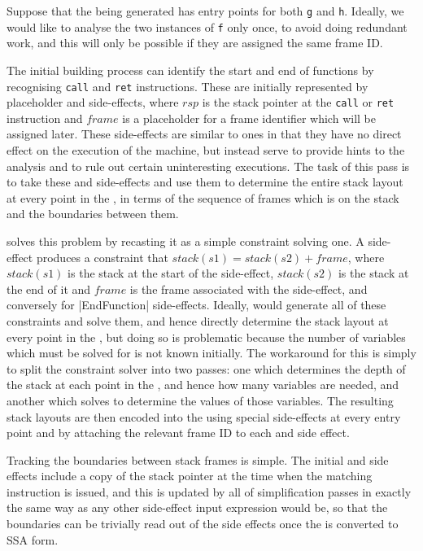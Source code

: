 Suppose that the \StateMachine being generated has entry points for
both \verb|g| and \verb|h|.  Ideally, we would like to analyse the two
instances of \verb|f| only once, to avoid doing redundant work, and
this will only be possible if they are assigned the same frame ID.

The initial \StateMachine building process can identify the start and
end of functions by recognising \verb|call| and \verb|ret|
instructions.  These are initially represented by placeholder
 and  side-effects, where $rsp$ is the stack pointer at the
\verb|call| or \verb|ret| instruction and $frame$ is a placeholder for
a frame identifier which will be assigned later.  These side-effects
are similar to  ones in that they have no direct effect
on the execution of the machine, but instead serve to provide hints to
the analysis and to rule out certain uninteresting executions.  The
task of this pass is to take these  and
 side-effects and use them to determine the entire
stack layout at every point in the \StateMachine, in terms of the
sequence of frames which is on the stack and the boundaries between
them.

{\Technique} solves this problem by recasting it as a simple
constraint solving one.  A  side-effect
produces a constraint that $stack(s1) = stack(s2) + frame$, where
$stack(s1)$ is the stack at the start of the side-effect, $stack(s2)$
is the stack at the end of it and $frame$ is the frame associated with
the side-effect, and conversely for \state|EndFunction| side-effects.
Ideally, {\Technique} would generate all of these constraints and
solve them, and hence directly determine the stack layout at every
point in the {\StateMachine}, but doing so is problematic because the
number of variables which must be solved for is not known initially.
The workaround for this is simply to split the constraint solver into
two passes: one which determines the depth of the stack at each point
in the \StateMachine, and hence how many variables are needed, and
another which solves to determine the values of those variables.  The
resulting stack layouts are then encoded into the \StateMachine using
special  side-effects at every entry point and by
attaching the relevant frame ID to each  and
 side effect.

Tracking the boundaries between stack frames is simple.  The initial
 and  side effects include a
copy of the stack pointer at the time when the matching instruction is
issued, and this is updated by all of {\StateMachine} simplification
passes in exactly the same way as any other side-effect input
expression would be, so that the boundaries can be trivially read out
of the side effects once the {\StateMachine} is converted to SSA form.

